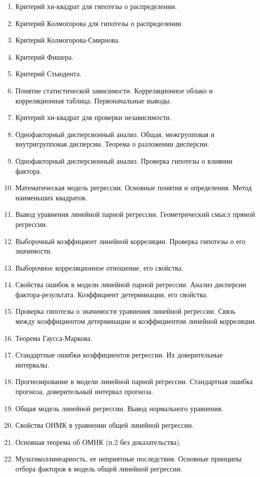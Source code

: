 \documentclass[12pt]{article}
\begin{document}
\begin{enumerate}
    \item Критерий хи-квадрат для гипотезы о распределении.
    \item Критерий Колмогорова для гипотезы о распределении.
    \item Критерий Колмогорова-Смирнова.
    \item Критерий Фишера.
    \item Критерий Стьюдента.
    \item Понятие статистической зависимости. Корреляционное облако и корреляционная таблица. Первоначальные выводы.
    \item Критерий хи-квадрат для проверки независимости.
    \item Однофакторный дисперсионный анализ. Общая, межгрупповая и внутригрупповая дисперсии. Теорема о разложении дисперсии.
    \item Однофакторный дисперсионный анализ. Проверка гипотезы о влиянии фактора.
    \item Математическая модель регрессии. Основные понятия и определения. Метод наименьших квадратов.
    \item Вывод уравнения линейной парной регрессии. Геометрический смысл прямой регрессии.
    \item Выборочный коэффициент линейной корреляции. Проверка гипотезы о его значимости.
    \item Выборочное корреляционное отношение, его свойства.
    \item Свойства ошибок в модели линейной парной регрессии. Анализ дисперсии фактора-результата. Коэффициент детерминации, его свойства.
    \item Проверка гипотезы о значимости уравнения линейной регрессии. Связь между коэффициентом детерминации и коэффициентом линейной корреляции.
    \item Теорема Гаусса-Маркова.
    \item Стандартные ошибки коэффициентов регрессии. Их доверительные интервалы.
    \item Прогнозирование в модели линейной парной регрессии. Стандартная ошибка прогноза, доверительный интервал прогноза.
    \item Общая модель линейной регрессии. Вывод нормального уравнения.
    \item Свойства ОНМК в уравнении общей линейной регрессии.
    \item Основная теорема об ОМНК (п.2 без доказательства).
    \item Мультиколлинеарность, ее неприятные последствия. Основные принципы отбора факторов в модель общей линейной регрессии.

\end{enumerate}
\end{document}
